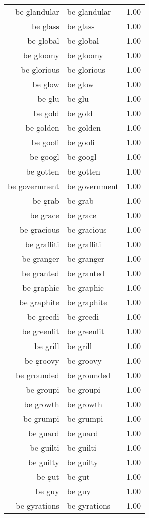 \begin{table}[ht]
\begin{tabular}{rlr}
  be glandular & be glandular & 1.00 \\ 
  be glass & be glass & 1.00 \\ 
  be global & be global & 1.00 \\ 
  be gloomy & be gloomy & 1.00 \\ 
  be glorious & be glorious & 1.00 \\ 
  be glow & be glow & 1.00 \\ 
  be glu & be glu & 1.00 \\ 
  be gold & be gold & 1.00 \\ 
  be golden & be golden & 1.00 \\ 
  be goofi & be goofi & 1.00 \\ 
  be googl & be googl & 1.00 \\ 
  be gotten & be gotten & 1.00 \\ 
  be government & be government & 1.00 \\ 
  be grab & be grab & 1.00 \\ 
  be grace & be grace & 1.00 \\ 
  be gracious & be gracious & 1.00 \\ 
  be graffiti & be graffiti & 1.00 \\ 
  be granger & be granger & 1.00 \\ 
  be granted & be granted & 1.00 \\ 
  be graphic & be graphic & 1.00 \\ 
  be graphite & be graphite & 1.00 \\ 
  be greedi & be greedi & 1.00 \\ 
  be greenlit & be greenlit & 1.00 \\ 
  be grill & be grill & 1.00 \\ 
  be groovy & be groovy & 1.00 \\ 
  be grounded & be grounded & 1.00 \\ 
  be groupi & be groupi & 1.00 \\ 
  be growth & be growth & 1.00 \\ 
  be grumpi & be grumpi & 1.00 \\ 
  be guard & be guard & 1.00 \\ 
  be guilti & be guilti & 1.00 \\ 
  be guilty & be guilty & 1.00 \\ 
  be gut & be gut & 1.00 \\ 
  be guy & be guy & 1.00 \\ 
  be gyrations & be gyrations & 1.00 \\ 

\end{tabular}
\end{table}
